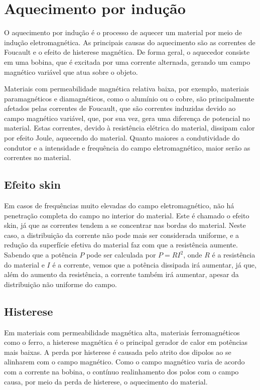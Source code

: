 \chapter{Aquecimento por indução}
O aquecimento por indução é o processo de aquecer um material por meio de indução eletromagnética. As principais causas do aquecimento são as correntes de Foucault e o efeito de histerese magnética. De forma geral, o aquecedor consiste em uma bobina, que é excitada por uma corrente alternada, gerando um campo magnético variável que atua sobre o objeto.

Materiais com permeabilidade magnética relativa baixa, por exemplo, materiais paramagnéticos e diamagnéticos, como o alumínio ou o cobre, são principalmente afetados pelas correntes de Foucault, que são correntes induzidas devido ao campo magnético variável, que, por sua vez, gera uma diferença de potencial no material. Estas correntes, devido à resistência elétrica do material, dissipam calor por efeito Joule, aquecendo do material. Quanto maiores a condutividade do condutor e a intensidade e frequência do campo eletromagnético, maior serão as correntes no material.
\section{Efeito skin}
Em casos de frequências muito elevadas do campo eletromagnético, não há penetração completa do campo no interior do material. Este é chamado o efeito skin, já que as correntes tendem a se concentrar nas bordas do material. Neste caso, a distribuição da corrente não pode mais ser considerada uniforme, e a redução da superfície efetiva do material faz com que a resistência aumente. Sabendo que a potência $P$ pode ser calculada por $P = RI^2$, onde $R$ é a resistência do material e $I$ é a corrente, vemos que a potência dissipada irá aumentar, já que, além do aumento da resistência, a corrente também irá aumentar, apesar da distribuição não uniforme do campo.
\section{Histerese}
Em materiais com permeabilidade magnética alta, materiais ferromagnéticos como o ferro, a histerese magnética é o principal gerador de calor em potências mais baixas. A perda por histerese é causada pelo atrito dos dipolos ao se alinharem com o campo magnético. Como o campo magnético varia de acordo com a corrente na bobina, o contínuo realinhamento dos polos com o campo causa, por meio da perda de histerese, o aquecimento do material.